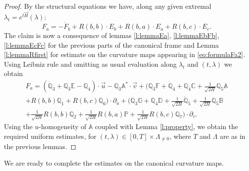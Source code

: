 \documentclass[11pt,a4paper]{article}
\theoremstyle{plain}
\theoremstyle{definition}
\theoremstyle{remark}
\numberwithin{equation}{section}
\newcommand{\A}{\mathbb{A}}
\newcommand{\B}{\mathbb{B}}
\newcommand{\C}{\mathbb{C}}
\newcommand{\D}{\mathbb{D}}
\newcommand{\E}{\mathbb{E}}
\newcommand{\F}{\mathbb{F}}
\newcommand{\G}{\mathbb{G}}
\renewcommand{\P}{\mathbb{P}}
\newcommand{\Q}{\mathbb{Q}}
\begin{document}
\begin{proof}
By the structural equations we have, along any given extremal $\lambda_t=e^{t\vec{H}}(\lambda)$:
\begin{equation}\label{eq:formulaFa2}
F_a = -\dot{F}_b + R(b,b)\cdot E_b +R(b,a)\cdot E_a + R(b,c)\cdot E_c.
\end{equation}
The claim is now a consequence of lemmas \ref{l:lemmaEa}, \ref{l:lemmaEbFb}, \ref{l:lemmaEcFc} for the previous parts of the canonical frame and Lemma \ref{l:lemmaRfirst} for estimate on the curvature maps appearing in \eqref{eq:formulaFa2}. Using Leibniz rule and omitting as usual evaluation along $\lambda_t$ and $(t,\lambda)$ we obtain
\begin{multline}
F_a  = \left(\dot{\Q}_3 + \Q_3\E - \Q_4\right) \cdot \vec{u} - \Q_3\A^*\cdot \vec{v} 
+\bigg(\Q_3 \F + \dot{\Q}_4 + \Q_4\C + \frac{1}{\sqrt{2H}}\Q_5 \A  \\
+ R(b,b)\Q_1 + R(b,c)\Q_6 \bigg)\cdot\partial_u 
+\bigg( \Q_3 \G + \Q_4 \D + \frac{1}{\sqrt{2H}}\dot{\Q}_5 + \frac{1}{\sqrt{2H}}\Q_5\B \\
+ \frac{1}{\sqrt{2H}}R(b,b)\Q_2 + \frac{1}{\sqrt{2H}}R(b,a)\P+ \frac{1}{\sqrt{2H}}R(b,c)\Q_7\bigg)\cdot \partial_v.
\end{multline}
Using the $u$-homogeneity of $\A$ coupled with Lemma \ref{l:property}, we obtain the required uniform estimates, for $(t,\lambda) \in [0,T]\times \Lambda_{\neq 0}$, where $T$ and $\Lambda$ are as in the previous lemmas.
\end{proof}


We are ready to complete the estimates on the canonical curvature maps.
\end{document}
